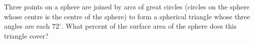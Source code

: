 Three points on a sphere are joined by arcs of great circles (circles on the sphere whose centre is the centre of the sphere) to form a spherical triangle whose three angles are each $72^\circ$. What percent of the surface area of the sphere does this triangle cover?
